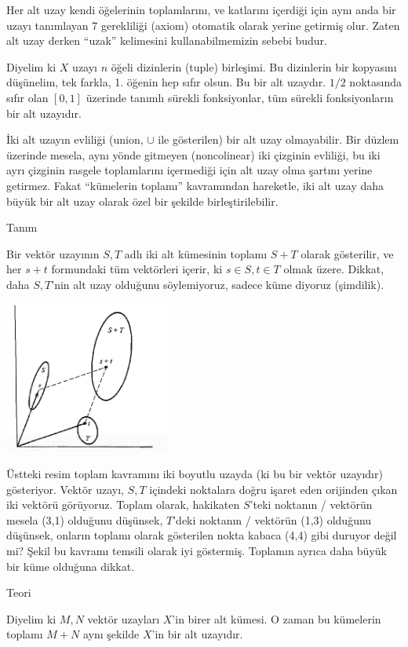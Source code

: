 \documentclass[12pt,fleqn]{article}\usepackage{../../common}
\begin{document}
Her alt uzay kendi öğelerinin toplamlarını, ve katlarını içerdiği için aynı
anda bir uzayı tanımlayan 7 gerekliliği (axiom) otomatik olarak yerine
getirmiş olur. Zaten alt uzay derken ``uzak'' kelimesini kullanabilmemizin
sebebi budur.

Diyelim ki $X$ uzayı $n$ öğeli dizinlerin (tuple) birleşimi. Bu dizinlerin
bir kopyasını düşünelim, tek farkla, 1. öğenin hep sıfır olsun. Bu bir alt
uzaydır. $1/2$ noktasında sıfır olan $[0,1]$ üzerinde tanımlı sürekli
fonksiyonlar, tüm sürekli fonksiyonların bir alt uzayıdır.

İki alt uzayın evliliği (union, $\cup$ ile gösterilen) bir alt uzay
olmayabilir. Bir düzlem üzerinde mesela, aynı yönde gitmeyen (noncolinear)
iki çizginin evliliği, bu iki ayrı çizginin rasgele toplamlarını içermediği
için alt uzay olma şartını yerine getirmez. Fakat ``kümelerin toplamı''
kavramından hareketle, iki alt uzay daha büyük bir alt uzay olarak özel bir
şekilde birleştirilebilir.

Tanım

Bir vektör uzayının $S,T$ adlı iki alt kümesinin toplamı $S+T$ olarak
gösterilir, ve her $s+t$ formundaki tüm vektörleri içerir, ki $s \in S,t
\in T$ olmak üzere. Dikkat, daha $S,T$'nin alt uzay olduğunu söylemiyoruz,
sadece küme diyoruz (şimdilik).

\includegraphics[height=5cm]{3_1.png}

Üstteki resim toplam kavramını iki boyutlu uzayda (ki bu bir vektör
uzayıdır) gösteriyor. Vektör uzayı, $S,T$ içindeki noktalara doğru işaret
eden orijinden çıkan iki vektörü görüyoruz. Toplam olarak, hakikaten
$S$'teki noktanın / vektörün mesela (3,1) olduğunu düşünsek, $T$'deki
noktanın / vektörün (1,3) olduğunu düşünsek, onların toplamı olarak
gösterilen nokta kabaca (4,4) gibi duruyor değil mi? Şekil bu kavramı
temsili olarak iyi göstermiş. Toplamın ayrıca daha büyük bir küme olduğuna
dikkat.

Teori 

Diyelim ki $M,N$ vektör uzayları $X$'in birer alt kümesi. O zaman bu kümelerin
toplamı $M + N$ aynı şekilde $X$'in bir alt uzayıdır. 
\end{document}
